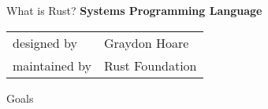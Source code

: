 \begin{frame}{What is Rust?}%
	\centering%
	\textbf{\large Systems Programming Language}\\[1em]
	\begin{tabular}{ll}
		{\scriptsize\color{gray} designed by}   & {\small  Graydon Hoare}   \\
		{\scriptsize\color{gray} maintained by} & {\small  Rust Foundation} \\
	\end{tabular}%

	\vspace{1cm}%

	\raggedright{\large\color{gray} Goals~\supercite{Faq}}\\[1.2em]
	\begin{columns}%
		\raggedleft{}%

		\centering{}%

		\raggedright{}%
	\end{columns}%
\end{frame}%
